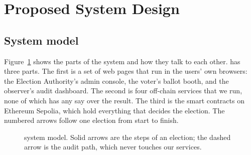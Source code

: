 \section{Proposed System Design}

\subsection{System model}

Figure~\ref{fig:model} shows the parts of the system and how they talk to each
other. \projectname{} has three parts. The first is a set of web pages that run
in the users' own browsers: the Election Authority's admin console, the voter's
ballot booth, and the observer's audit dashboard. The second is four off-chain
services that we run, none of which has any say over the result. The third is
the smart contracts on Ethereum Sepolia, which hold everything that decides the
election. The numbered arrows follow one election from start to finish.

\begin{figure}[htbp]
  \centering
  \resizebox{\textwidth}{!}{}
  \caption{\projectname{} system model. Solid arrows are the steps of an
    election; the dashed arrow is the audit path, which never touches our
    services.}
  \label{fig:model}
\end{figure}


